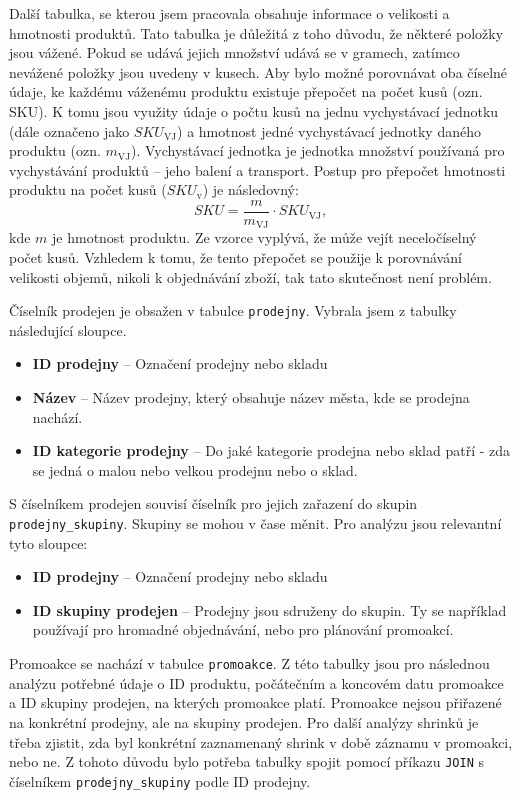 Další tabulka, se kterou jsem pracovala obsahuje informace o velikosti a hmotnosti produktů. Tato tabulka je důležitá z toho důvodu, že některé položky jsou vážené. Pokud se udává jejich množství udává se v gramech, zatímco nevážené položky jsou uvedeny v kusech. Aby bylo možné porovnávat oba číselné údaje, ke každému váženému produktu existuje přepočet na počet kusů (ozn. SKU). K tomu jsou využity údaje o počtu kusů na jednu vychystávací jednotku (dále označeno jako $SKU_{\mathrm{VJ}}$) a hmotnost jedné vychystávací jednotky daného produktu (ozn. $m_{\mathrm{VJ}}$). Vychystávací jednotka je jednotka množství používaná pro vychystávání produktů -- jeho balení a transport. Postup pro přepočet hmotnosti produktu na počet kusů ($SKU_{\mathrm{v}}$) je následovný: $$SKU = \frac{m}{m_{\mathrm{VJ}}} \cdot SKU_{\mathrm{VJ}},$$
kde $m$ je hmotnost produktu. Ze vzorce vyplývá, že může vejít neceločíselný počet kusů. Vzhledem k tomu, že tento přepočet se použije k porovnávání velikosti objemů, nikoli k objednávání zboží, tak tato skutečnost není problém.

Číselník prodejen je obsažen v tabulce \texttt{prodejny}. Vybrala jsem z tabulky následující sloupce.
\begin{itemize}
    \itemsep0em 
    \item \textbf{ID prodejny} -- Označení prodejny nebo skladu
    \item \textbf{Název} -- Název prodejny, který obsahuje název města, kde se prodejna nachází.
    \item \textbf{ID kategorie prodejny} -- Do jaké kategorie prodejna nebo sklad patří - zda se jedná o malou nebo velkou prodejnu nebo o sklad.
\end{itemize}

S číselníkem prodejen souvisí číselník pro jejich zařazení do skupin \texttt{prodejny\_skupiny}. Skupiny se mohou v čase měnit. Pro analýzu jsou relevantní tyto sloupce:
\begin{itemize}
    \itemsep0em 
    \item \textbf{ID prodejny} -- Označení prodejny nebo skladu
    \item \textbf{ID skupiny prodejen} -- Prodejny jsou sdruženy do skupin. Ty se například používají pro hromadné objednávání, nebo pro plánování promoakcí.
\end{itemize}    

Promoakce se nachází v tabulce \texttt{promoakce}. Z této tabulky jsou pro následnou analýzu potřebné údaje o ID produktu, počátečním a koncovém datu promoakce a ID skupiny prodejen, na kterých promoakce platí. Promoakce nejsou přiřazené na konkrétní prodejny, ale na skupiny prodejen. Pro další analýzy shrinků je třeba zjistit, zda byl konkrétní zaznamenaný shrink v době záznamu v promoakci, nebo ne. Z tohoto důvodu bylo potřeba tabulky spojit pomocí příkazu \texttt{JOIN} s číselníkem \texttt{prodejny\_skupiny} podle ID prodejny.

